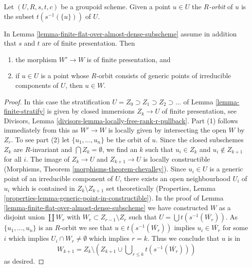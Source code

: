 \noindent
Let $(U, R, s, t, c)$ be a groupoid scheme. Given a point $u \in U$
the {\it $R$-orbit} of $u$ is the subset $t(s^{-1}(\{u\}))$ of $U$.

\begin{lemma}
\label{lemma-finite-flat-over-almost-dense-subscheme-addendum}
In Lemma \ref{lemma-finite-flat-over-almost-dense-subscheme}
assume in addition that $s$ and $t$ are of finite presentation.
Then
\begin{enumerate}
\item the morphism $W' \to W$ is of finite presentation, and
\item if $u \in U$ is a point whose $R$-orbit consists of
generic points of irreducible components of $U$, then $u \in W$.
\end{enumerate}
\end{lemma}

\begin{proof}
In this case the stratification
$U = Z_0 \supset Z_1 \supset Z_2 \supset \ldots$ of
Lemma \ref{lemma-finite-stratify} is given by closed immersions $Z_k \to U$
of finite presentation, see
Divisors, Lemma \ref{divisors-lemma-locally-free-rank-r-pullback}.
Part (1) follows immediately from this as $W' \to W$ is locally given
by intersecting the open $W$ by $Z_r$. To see part (2)
let $\{u_1, \ldots, u_n\}$ be the orbit of $u$.
Since the closed subschemes $Z_k$ are $R$-invariant and
$\bigcap Z_k = \emptyset$, we find an $k$ such that $u_i \in Z_k$
and $u_i \not \in Z_{k + 1}$ for all $i$.
The image of $Z_k \to U$ and $Z_{k + 1} \to U$ is locally constructible
(Morphisms, Theorem \ref{morphisms-theorem-chevalley}).
Since $u_i \in U$ is a generic point of an irreducible component
of $U$, there exists an open neighbourhood $U_i$ of $u_i$ which
is contained in $Z_k \setminus Z_{k + 1}$ set theoretically
(Properties, Lemma \ref{properties-lemma-generic-point-in-constructible}).
In the proof of Lemma \ref{lemma-finite-flat-over-almost-dense-subscheme}
we have constructed $W$ as a disjoint union $\coprod W_r$
with $W_r \subset Z_{r - 1} \setminus Z_r$ such that
$U = \bigcup t(s^{-1}(\overline{W_r}))$. As $\{u_1, \ldots, u_n\}$
is an $R$-orbit we see that $u \in t(s^{-1}(\overline{W_r}))$
implies $u_i \in \overline{W_r}$ for some $i$ which implies
$U_i \cap W_r \not = \emptyset$ which implies $r = k$.
Thus we conclude that $u$ is in
$$
W_{k + 1} = Z_k \setminus
\left(
Z_{k + 1} \cup \bigcup\nolimits_{r \leq k} t(s^{-1}(\overline{W_r}))
\right)
$$
as desired.
\end{proof}

